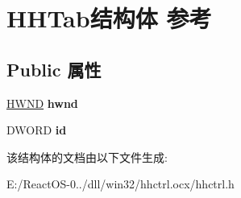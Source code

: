 \hypertarget{struct_h_h_tab}{}\section{H\+H\+Tab结构体 参考}
\label{struct_h_h_tab}
\subsection*{Public 属性}
\begin{DoxyCompactItemize}
\item 
\mbox{\label{struct_h_h_tab_a22671d06835f905b181b7cf4518f8843}} 
\hyperlink{interfacevoid}{H\+W\+ND} {\bfseries hwnd}
\item 
\mbox{\label{struct_h_h_tab_a6c1becc5bfa78d7b1228bcc39bd32d64}} 
D\+W\+O\+RD {\bfseries id}
\end{DoxyCompactItemize}


该结构体的文档由以下文件生成\+:\begin{DoxyCompactItemize}
\item 
E\+:/\+React\+O\+S-\/0../dll/win32/hhctrl.\+ocx/hhctrl.\+h\end{DoxyCompactItemize}
